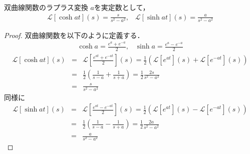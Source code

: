 \documentclass[uplatex, dvipdfmx, fleqn, a4paper, 10pt]{ujreport}
\begin{document}
\begin{exprbox}{双曲線関数のラプラス変換}
    $a$を実定数として，
    \begin{eqnarray}
        \mathcal{L}[\cosh at](s) = \frac{s}{s^2 - a^2},\hspace{10pt}\mathcal{L}[\sinh at](s) = \frac{a}{s^2 - a^2}
    \end{eqnarray}
    \begin{proof}
        双曲線関数を以下のように定義する．
        \begin{eqnarray}
            \cosh a = \frac{e^{a} + e^{-a}}{2},\hspace{10pt}\sinh a = \frac{e^{a} - e^{-a}}{2}
        \end{eqnarray}
        \begin{eqnarray*}
            \mathcal{L}[\cosh at](s) &=& \mathcal{L}[\frac{e^{at} + e^{-at}}{2}](s)
            = \frac{1}{2}\left(\mathcal{L}[e^{at}](s) + \mathcal{L}[e^{-at}](s)\right)\\
            &=& \frac{1}{2} \left(\frac{1}{s - a} + \frac{1}{s + a}\right)
            = \frac{1}{2} \frac{2s}{s^2 - a^2} \\
            &=& \frac{s}{s^2 - a^2}
        \end{eqnarray*}
        同様に
        \begin{eqnarray*}
            \mathcal{L}[\sinh at](s) &=& \mathcal{L}[\frac{e^{at} - e^{-at}}{2}](s)
            = \frac{1}{2}\left(\mathcal{L}[e^{at}](s) - \mathcal{L}[e^{-at}](s)\right)\\
            &=& \frac{1}{2} \left(\frac{1}{s - a} - \frac{1}{s + a}\right)
            = \frac{1}{2} \frac{2a}{s^2 - a^2} \\
            &=& \frac{a}{s^2 - a^2}
        \end{eqnarray*}
    \end{proof}
\end{exprbox}
\end{document}
